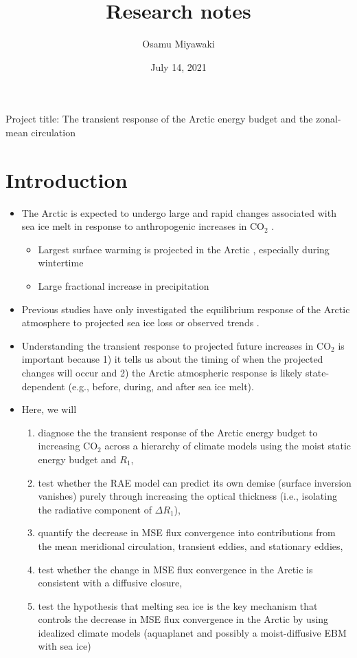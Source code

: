 \documentclass{article}
\title{Research notes}
\date{July 14, 2021}
\author{Osamu Miyawaki}
\begin{document}
\maketitle

Project title: The transient response of the Arctic energy budget and the zonal-mean circulation

\section*{Introduction}
\begin{itemize}
    \item The Arctic is expected to undergo large and rapid changes associated with sea ice melt in response to anthropogenic increases in CO$_2$ \citep{dai2019, feldl2020}.
    \begin{itemize}
        \item Largest surface warming is projected in the Arctic \citep[Arctic Amplification, e.g.][]{manabe1975, held1993}, especially during wintertime
        \item Large fractional increase in precipitation \citep{bintanja2014,siler2018}
    \end{itemize}
    \item Previous studies have only investigated the equilibrium response of the Arctic atmosphere to projected sea ice loss \citep{deser2010} or observed trends \citep{screen2013}.
    \item Understanding the transient response to projected future increases in CO$_2$ is important because 1) it tells us about the timing of when the projected changes will occur and 2) the Arctic atmospheric response is likely state-dependent (e.g., before, during, and after sea ice melt).
    \item Here, we will
    \begin{enumerate}
        \item diagnose the the transient response of the Arctic energy budget to increasing CO$_2$ across a hierarchy of climate models using the moist static energy budget and $R_1$,
        \item test whether the RAE model \citep{cronin2016} can predict its own demise (surface inversion vanishes) purely through increasing the optical thickness (i.e., isolating the radiative component of $\Delta R_1$),
        \item quantify the decrease in MSE flux convergence into contributions from the mean meridional circulation, transient eddies, and stationary eddies,
        \item test whether the change in MSE flux convergence in the Arctic is consistent with a diffusive closure,
        \item test the hypothesis that melting sea ice is the key mechanism that controls the decrease in MSE flux convergence in the Arctic by using idealized climate models (aquaplanet and possibly a moist-diffusive EBM with sea ice) 
    \end{enumerate}
\end{itemize}
\end{document}
